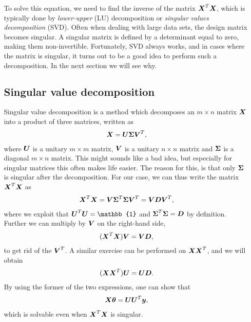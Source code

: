 To solve this equation, we need to find the inverse of the matrix $\boldsymbol{{X}}^T\boldsymbol{{X}}$, which is typically done by \textit{lower-upper} (LU) decomposition or \textit{singular values decomposition} (SVD). Often when dealing with large data sets, the design matrix becomes singular. A singular matrix is defined by a determinant equal to zero, making them non-invertible. Fortunately, SVD always works, and in cases where the matrix is singular, it turns out to be a good idea to perform such a decomposition. In the next section we will see why.

\subsection{Singular value decomposition}
Singular value decomposition is a method which decomposes an $m\times n$ matrix $\boldsymbol{{X}}$ into a product of three matrices, written as
\begin{equation}
\boldsymbol{{X}}=\boldsymbol{{U}}\boldsymbol{{\Sigma}}\boldsymbol{{V}}^T,
\end{equation}
where $\boldsymbol{{U}}$ is a unitary $m\times m$ matrix, $\boldsymbol{{V}}$ is a unitary $n\times n$ matrix and $\boldsymbol{{\Sigma}}$ is a diagonal $m\times n$ matrix. This might sounds like a bad idea, but especially for singular matrices this often makes life easier. The reason for this, is that only $\boldsymbol{{\Sigma}}$ is singular after the decomposition. For our case, we can thus write the matrix $\boldsymbol{{X}}^T\boldsymbol{{X}}$ as 
\begin{equation}
\boldsymbol{{X}}^T\boldsymbol{{X}}=\boldsymbol{{V}}\boldsymbol{{\Sigma}}^T\boldsymbol{{\Sigma}}\boldsymbol{{V}}^T=\boldsymbol{{V}}\boldsymbol{{D}}\boldsymbol{{V}}^T,
\end{equation}
where we exploit that $\bs{U}^T\bs{U}=\mathbb{1}$ and $\boldsymbol{{\Sigma}}^T\boldsymbol{{\Sigma}}=\boldsymbol{{D}}$ by definition. Further we can multiply by $\boldsymbol{{V}}$ on the right-hand side,
\begin{equation}
(\boldsymbol{{X}}^T\boldsymbol{{X}})\boldsymbol{{V}}=\boldsymbol{{V}}\boldsymbol{{D}},
\end{equation}
to get rid of the $\boldsymbol{{V}}^T$. A similar exercise can be performed on $\boldsymbol{{X}}\boldsymbol{{X}}^T$, and we will obtain
\begin{equation}
(\boldsymbol{{X}}\boldsymbol{{X}}^T)\boldsymbol{{U}}=\boldsymbol{{U}}\boldsymbol{{D}}.
\end{equation}
By using the former of the two expressions, one can show that
\begin{equation}
\boldsymbol{{X}}\boldsymbol{{\theta}}=\boldsymbol{{U}}\boldsymbol{{U}}^T\boldsymbol{{y}},
\end{equation}
which is solvable even when $\boldsymbol{{X}}^T\boldsymbol{{X}}$ is singular.

